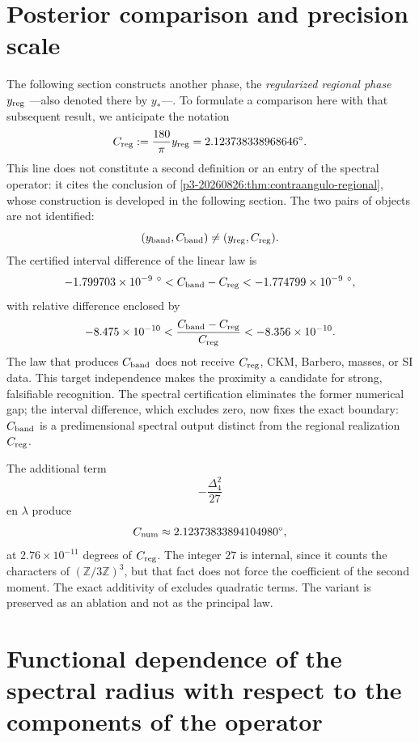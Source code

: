 \section{Posterior comparison and precision scale}

The following section constructs another phase, the \emph{regularized regional
phase} \(y_{\rm reg}\) ---also denoted there by \(y_*\)---. To
formulate a comparison here with that subsequent result, we anticipate the
notation
\[
 C_{\rm reg}:=\frac{180}{\pi}y_{\rm reg}
 =2.123738338968646^\circ.
\]
This line does not constitute a second definition or an entry of the
spectral operator: it cites the conclusion of
\cref{p3-20260826:thm:contraangulo-regional}, whose construction is developed in the
following section.
The two pairs of objects are not identified:
\[
 (y_{\rm band},C_{\rm band})
 \ne
 (y_{\rm reg},C_{\rm reg}).
\]
The certified interval difference of the linear law is
\[
 -1.799703\times10^{-9}\ {}^\circ
 <C_{\rm band}-C_{\rm reg}
 <-1.774799\times10^{-9}\ {}^\circ,
\]
with relative difference enclosed by
\[
 -8.475\times10^{-10}
 <\frac{C_{\rm band}-C_{\rm reg}}{C_{\rm reg}}
 <-8.356\times10^{-10}.
\]
The law that produces \(C_{\rm band}\) does not receive \(C_{\rm reg}\), CKM, Barbero,
masses, or SI data\@. This target independence makes the proximity a
candidate for strong, falsifiable recognition. The spectral certification
eliminates the former numerical gap; the interval difference, which excludes
zero, now fixes the exact boundary: \(C_{\rm band}\) is a predimensional spectral
output distinct from the regional realization
\(C_{\rm reg}\).

The additional term
\[
 -\frac{\Delta_4^2}{27}
\]
en \(\lambda\) produce
\[
 C_{\rm num}\approx2.12373833894104980{}^\circ,
\]
at \(2.76\times10^{-11}\) degrees of \(C_{\rm reg}\). The integer \(27\) is internal,
since it counts the characters of \((\mathbb Z/3\mathbb Z)^3\), but that
fact does not force the coefficient of the second moment. The exact additivity of
\HAdd excludes quadratic terms. The variant is preserved as an ablation and not
as the principal law.

\section{Functional dependence of the spectral radius with respect to the components of the operator}

